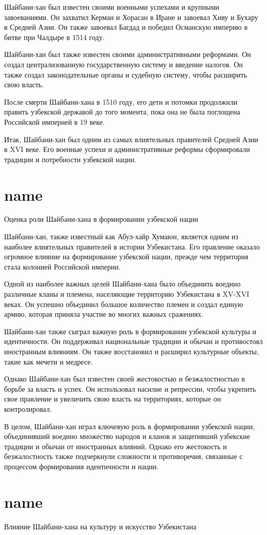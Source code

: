 \documentclass[draft]{article}
\begin{document}
Шайбани-хан был известен своими военными успехами и крупными завоеваниями. Он захватил Керман и Хорасан в Иране и завоевал Хиву и Бухару в Средней Азии. Он также завоевал Багдад и победил Османскую империю в битве при Чалдыре в 1514 году.

Шайбани-хан был также известен своими административными реформами. Он создал централизованную государственную систему и введение налогов. Он также создал законодательные органы и судебную систему, чтобы расширить свою власть.

После смерти Шайбани-хана в 1510 году, его дети и потомки продолжили править узбекской державой до того момента, пока она не была поглощена Российской империей в 19 веке. 

Итак, Шайбани-хан был одним из самых влиятельных правителей Средней Азии в XVI веке. Его военные успехи и административные реформы сформировали традиции и потребности узбекской нации.\newpage\section{name}
Оценка роли Шайбани-хана в формировании узбекской нации

Шайбани-хан, также известный как Абул-хайр Хумаюн, является одним из наиболее влиятельных правителей в истории Узбекистана. Его правление оказало огромное влияние на формирование узбекской нации, прежде чем территория стала колонией Российской империи.

Одной из наиболее важных целей Шайбани-хана было объединить воедино различные кланы и племена, населяющие территорию Узбекистана в XV-XVI веках. Он успешно объединил большое количество племен и создал единую армию, которая приняла участие во многих важных сражениях.

Шайбани-хан также сыграл важную роль в формировании узбекской культуры и идентичности. Он поддерживал национальные традиции и обычаи и противостоял иностранным влияниям. Он также восстановил и расширил культурные объекты, такие как мечети и медресе.

Однако Шайбани-хан был известен своей жестокостью и безжалостностью в борьбе за власть и успех. Он использовал насилие и репрессии, чтобы укрепить свое правление и увеличить свою власть на территориях, которые он контролировал.

В целом, Шайбани-хан играл ключевую роль в формировании узбекской нации, объединивший воедино множество народов и кланов и защитивший узбекские традиции и обычаи от иностранных влияний. Однако его жестокость и безжалостность также подчеркнули сложности и противоречия, связанные с процессом формирования идентичности и нации.\newpage\section{name}
Влияние Шайбани-хана на культуру и искусство Узбекистана
\end{document}
